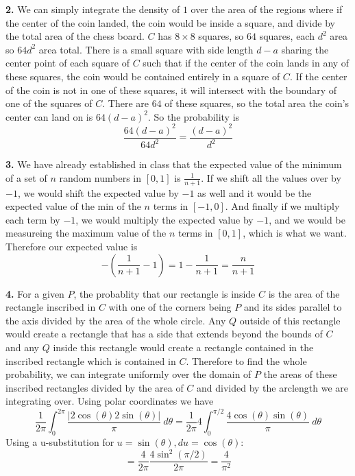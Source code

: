 \documentclass[12pt]{article}
\newenvironment{ques}{\vspace{2 ex}}{\vspace{2 ex}}
\theoremstyle{definition}
\begin{document}
\begin{ques}
\end{ques}

\begin{ques}
	\textbf{2.}  %
		We can simply integrate the density of $1$ over the area of the
		regions where if the center of the coin landed, the coin would
		be inside a square, and divide by the total area of the chess
		board. $C$ has $8 \times 8$ squares, so $64$ squares,
		each $d^2$ area so $64d^2$ area total. There is a small square
		with side length $d - a$ sharing the center point of each
		square of $C$ such that if the center of the coin lands in any of these
		squares, the coin would be contained entirely in a square of
		$C$. If the center of the coin is not in one of these squares,
		it will intersect with the boundary of one of the squares of
		$C$. There are $64$ of these squares, so the total area the
		coin's center can land on is $64(d-a)^2$. So the probability is 
		$$\frac{64(d-a)^2}{64d^2} = \frac{(d-a)^2}{d^2}$$

\end{ques}

\begin{ques}
	\textbf{3.}  %
		We have already established in class that the expected value of
		the minimum of a set of $n$ random numbers in $[0, 1]$ is
		$\frac{1}{n+1}$. If we shift all the values over by $-1$, we would
		shift the expected value by $-1$ as well and it would be the
		expected value of the min of the $n$ terms in $[-1, 0]$. And
		finally if we multiply each term by $-1$, we would multiply the
		expected value by $-1$, and we would be measureing the maximum
		value of the $n$ terms in $[0,1]$, which is what we want.
		Therefore our expected value is 
		$$-(\frac{1}{n+1} - 1) = 1 - \frac{1}{n+1} = \frac{n}{n+1}$$

\end{ques}

\begin{ques}
	\textbf{4.}   %
		For a given $P$, the probablity that our rectangle is inside
		$C$ is the area of the rectangle inscribed in $C$ with one of
		the corners being $P$ and its sides parallel to the axis
		divided by the area of the whole circle. Any
		$Q$ outside of this rectangle would create a rectangle that has
		a side that extends beyond the bounds of $C$ and any $Q$ inside
		this rectangle would create a rectangle contained in the
		inscribed rectangle which is contained in $C$. Therefore to
		find the whole probability, we can integrate uniformly over the
		domain of $P$ the areas of these inscribed rectangles divided
		by the area of $C$ and divided by the arclength we are
		integrating over. Using polar coordinates we have
		$$\frac{1}{2\pi}\int_{0}^{2\pi} \frac{|2\cos(\theta)2\sin(\theta)|}{\pi} \ d
		\theta = \frac{1}{2\pi}4\int_{0}^{\pi/2}
		\frac{4\cos(\theta)\sin(\theta)}{\pi} \ d \theta$$
		Using a u-substitution for $u = \sin(\theta), du =
		\cos(\theta)$:
		$$= \frac{4}{2\pi}\frac{4\sin^2(\pi/2)}{2\pi} = \frac{4}{\pi ^ 2}$$
\end{ques}
\end{document}
